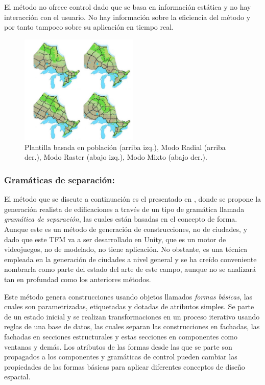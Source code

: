             El método no ofrece control dado que se basa en información estática y no hay interacción con el usuario. No hay información sobre la eficiencia del método y por tanto tampoco sobre su aplicación en tiempo real.
        
            \begin{figure}[h]
                \centering
                \includegraphics[width=0.5\textwidth]{img/template-terrains.png}
                \caption{Plantilla basada en población (arriba izq.), Modo Radial (arriba der.), Modo Raster (abajo izq.), Modo Mixto (abajo der.).}
            \end{figure}

        \subsubsection{Gramáticas de separación:} El método que se discute a continuación es el presentado en \cite{Wonka2003}, donde se propone la generación realista de edificaciones a través de un tipo de gramática llamada \textit{gramática de separación}, las cuales están basadas en el concepto de forma. Aunque este es un método de generación de construcciones, no de ciudades, y dado que este TFM va a ser desarrollado en Unity, que es un motor de videojuegos, no de modelado, no tiene aplicación. No obstante, es una técnica empleada en la generación de ciudades a nivel general y se ha creído conveniente nombrarla como parte del estado del arte de este campo, aunque no se analizará tan en profundad como los anteriores métodos.
        
            Este método genera construcciones usando objetos llamados \textit{formas básicas}, las cuales son parametrizadas, etiquetadas y dotadas de atributos simples. Se parte de un estado inicial y se realizan transformaciones en un proceso iterativo usando reglas de una base de datos, las cuales separan las construcciones en fachadas, las fachadas en secciones estructurales y estas secciones en componentes como ventanas y demás. Los atributos de las formas desde las que se parte son propagados a los componentes y gramáticas de control pueden cambiar las propiedades de las formas básicas para aplicar diferentes conceptos de diseño espacial. 

